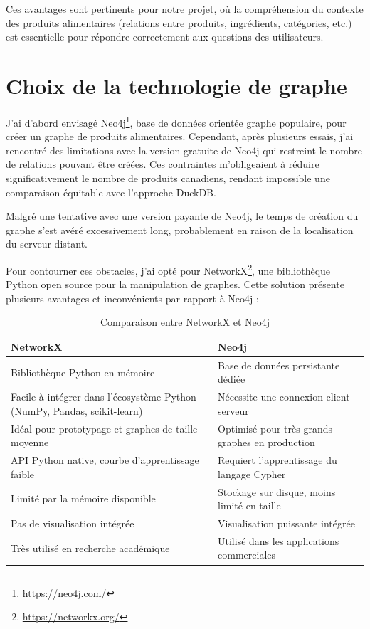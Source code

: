 \documentclass[a4paper,11pt]{article}
\begin{document}
Ces avantages sont pertinents pour notre projet, où la compréhension du 
contexte des produits alimentaires (relations entre produits, ingrédients, catégories, etc.) est essentielle pour répondre correctement aux questions des utilisateurs.


\section{Choix de la technologie de graphe}
\label{sec:choix-graphe}

J'ai d'abord envisagé Neo4j\footnote{\url{https://neo4j.com/}}, base de données orientée graphe populaire, pour créer un graphe de produits alimentaires. Cependant, après plusieurs essais, j'ai rencontré des limitations avec la version gratuite de Neo4j qui restreint le nombre de relations pouvant être créées. Ces contraintes m'obligeaient à réduire significativement le nombre de produits canadiens, rendant impossible une comparaison équitable avec l'approche DuckDB.

Malgré une tentative avec une version payante de Neo4j, le temps de création du graphe s'est avéré excessivement long, probablement en raison de la localisation du serveur distant.

Pour contourner ces obstacles, j'ai opté pour NetworkX\footnote{\url{https://networkx.org/}}, une bibliothèque Python open source pour la manipulation de graphes. Cette solution présente plusieurs avantages et inconvénients par rapport à Neo4j :

\begin{table}[H]
\small
\centering
\begin{tabular}{p{}|p{}}
\toprule
\textbf{NetworkX} & \textbf{Neo4j} \\
\midrule
Bibliothèque Python en mémoire & Base de données persistante dédiée \\
\hline
Facile à intégrer dans l'écosystème Python (NumPy, Pandas, scikit-learn) & Nécessite une connexion client-serveur \\
\hline
Idéal pour prototypage et graphes de taille moyenne & Optimisé pour très grands graphes en production \\
\hline
API Python native, courbe d'apprentissage faible & Requiert l'apprentissage du langage Cypher \\
\hline
Limité par la mémoire disponible & Stockage sur disque, moins limité en taille \\
\hline
Pas de visualisation intégrée & Visualisation puissante intégrée \\
\hline
Très utilisé en recherche académique & Utilisé dans les applications commerciales \\
\bottomrule
\end{tabular}
\caption{Comparaison entre NetworkX et Neo4j}
\label{tab:comparaison-graphes}
\end{table}
\end{document}
